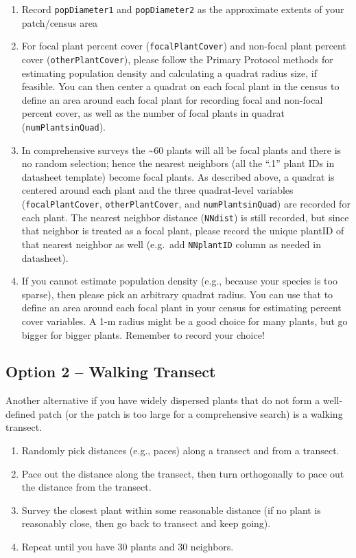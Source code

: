 \documentclass[
  letterpaper,
  oneside,
  open=any]{scrbook}
\begin{document}
\begin{enumerate}
\def\labelenumi{\arabic{enumi}.}
\item
  Record \texttt{popDiameter1} and \texttt{popDiameter2} as the
  approximate extents of your patch/census area
\item
  For focal plant percent cover (\texttt{focalPlantCover}) and non-focal
  plant percent cover (\texttt{otherPlantCover}), please follow the
  Primary Protocol methods for estimating population density and
  calculating a quadrat radius size, if feasible. You can then center a
  quadrat on each focal plant in the census to define an area around
  each focal plant for recording focal and non-focal percent cover, as
  well as the number of focal plants in quadrat
  (\texttt{numPlantsinQuad}).
\item
  In comprehensive surveys the \textasciitilde60 plants will all be
  focal plants and there is no random selection; hence the nearest
  neighbors (all the ``.1'' plant IDs in datasheet template) become
  focal plants. As described above, a quadrat is centered around each
  plant and the three quadrat-level variables (\texttt{focalPlantCover},
  \texttt{otherPlantCover}, and \texttt{numPlantsinQuad}) are recorded
  for each plant. The nearest neighbor distance (\texttt{NNdist}) is
  still recorded, but since that neighbor is treated as a focal plant,
  please record the unique plantID of that nearest neighbor as well
  (e.g.~add \texttt{NNplantID} column as needed in datasheet).
\item
  If you cannot estimate population density (e.g., because your species
  is too sparse), then please pick an arbitrary quadrat radius. You can
  use that to define an area around each focal plant in your census for
  estimating percent cover variables. A 1-m radius might be a good
  choice for many plants, but go bigger for bigger plants. Remember to
  record your choice!
\end{enumerate}

\subsection{Option 2 -- Walking
Transect}\label{option-2-walking-transect}

Another alternative if you have widely dispersed plants that do not form
a well-defined patch (or the patch is too large for a comprehensive
search) is a walking transect.

\begin{enumerate}
\def\labelenumi{\arabic{enumi}.}
\item
  Randomly pick distances (e.g., paces) along a transect and from a
  transect.
\item
  Pace out the distance along the transect, then turn orthogonally to
  pace out the distance from the transect.
\item
  Survey the closest plant within some reasonable distance (if no plant
  is reasonably close, then go back to transect and keep going).
\item
  Repeat until you have 30 plants and 30 neighbors.
\end{enumerate}
\end{document}
